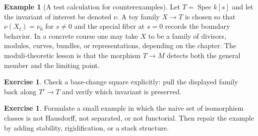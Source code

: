 \documentclass[11pt]{amsart}
\theoremstyle{definition}
\newtheorem{example}[theorem]{Example}
\newtheorem{exercise}[theorem]{Exercise}
\newcommand{\Spec}{\operatorname{Spec}}
\begin{document}
\begin{example}[A test calculation for counterexamples]
Let $T=\Spec k[s]$ and let the invariant of interest be denoted $\nu$.  A toy family $X\to T$ is chosen so that $\nu(X_t)=\nu_0$ for $s\ne0$ and the special fiber at $s=0$ records the boundary behavior.  In a concrete course one may take $X$ to be a family of divisors, modules, curves, bundles, or representations, depending on the chapter.  The moduli-theoretic lesson is that the morphism $T\to M$ detects both the general member and the limiting point.
\end{example}
\begin{exercise}
Check a base-change square explicitly: pull the displayed family back along $T\prime\to T$ and verify which invariant is preserved.
\end{exercise}
\begin{exercise}
Formulate a small example in which the naive set of isomorphism classes is not Hausdorff, not separated, or not functorial.  Then repair the example by adding stability, rigidification, or a stack structure.
\end{exercise}
\clearpage
\end{document}
